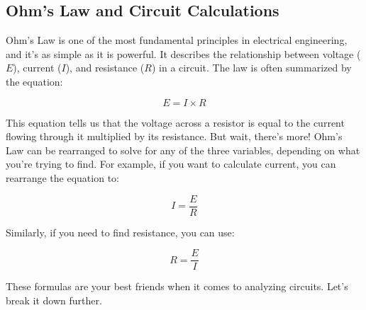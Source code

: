 \subsection{Ohm’s Law and Circuit Calculations}
\label{subsec:ohms-law}

Ohm's Law is one of the most fundamental principles in electrical engineering, and it’s as simple as it is powerful. It describes the relationship between voltage (\(E\)), current (\(I\)), and resistance (\(R\)) in a circuit. The law is often summarized by the equation:

\begin{equation}
    E = I \times R
    \label{eq:ohms-law}
\end{equation}

This equation tells us that the voltage across a resistor is equal to the current flowing through it multiplied by its resistance. But wait, there’s more! Ohm’s Law can be rearranged to solve for any of the three variables, depending on what you’re trying to find. For example, if you want to calculate current, you can rearrange the equation to:

\begin{equation}
    I = \frac{E}{R}
    \label{eq:current}
\end{equation}

Similarly, if you need to find resistance, you can use:

\begin{equation}
    R = \frac{E}{I}
    \label{eq:resistance}
\end{equation}

These formulas are your best friends when it comes to analyzing circuits. Let’s break it down further.

